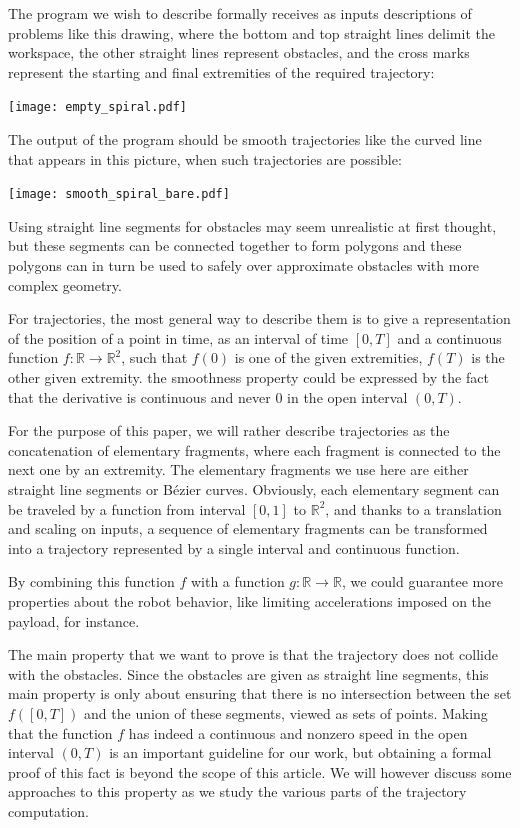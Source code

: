 \documentclass{easychair}
\begin{document}
The program we wish to describe formally receives as inputs
descriptions of problems like this drawing, where the bottom and top
straight lines delimit the workspace, the other straight lines
represent obstacles, and the cross marks represent the starting and
final extremities of the required trajectory:
\begin{center}
\texttt{[image: empty\_spiral.pdf]}
\end{center}
The output of the program should be smooth trajectories like the curved
line that appears in this picture, when such trajectories are possible:
\begin{center}
\texttt{[image: smooth\_spiral\_bare.pdf]}
\end{center}
Using straight line segments for obstacles may seem unrealistic at
first thought, but these segments can be connected together to form
polygons and these polygons can in turn be used to safely
over approximate obstacles with more complex geometry.

For trajectories, the most general way to describe them is to
give a representation of the position of a point in time,
as an interval of time \([0, T]\) and a continuous function \(f : {\mathbb R}
\rightarrow {\mathbb R}^2\), such that \(f(0)\) is one of the given
extremities, \(f(T)\) is the other given extremity.  the smoothness property
could be expressed by the fact that the derivative is continuous and
never 0 in the open interval \((0,T)\).

For the purpose of this
paper, we will rather describe trajectories as the concatenation of
elementary fragments, where each fragment is connected to the next one
by an extremity.  The elementary fragments we use here are either
straight line segments or Bézier curves.  Obviously, each elementary
segment can be traveled by a function from interval \([0,1]\) to
\({\mathbb R}^2\), and thanks to a translation and scaling on inputs,
a sequence of elementary fragments can be transformed into a
trajectory represented by a single interval and continuous function.

By combining this function \(f\) with a function \(g: {\mathbb R}
\rightarrow {\mathbb R}\), we could guarantee more properties about
the robot behavior, like limiting accelerations imposed on the
payload, for instance.

The main property that we want to prove is that the trajectory does
not collide with the obstacles.  Since the obstacles are given as
straight line segments, this main property is only about ensuring that
there is no intersection between the set \(f([0,T])\) and the union of
these segments, viewed as sets of points.  Making that the function
\(f\) has indeed a continuous and nonzero speed in the open interval
\((0,T)\) is an important guideline for our work, but obtaining a formal
proof of this fact is beyond the scope of this article.  We will
however discuss some approaches to this property as we study the
various parts of the trajectory computation.
\end{document}
